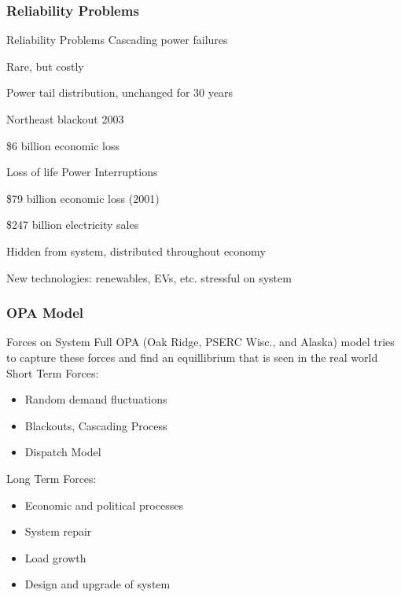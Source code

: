 \subsubsection{Reliability Problems}
\begin{frame}{Reliability Problems}
\alert{Cascading power failures}
\bi
\item Rare, but costly
\item Power tail distribution, unchanged for 30 years
\item Northeast blackout 2003
\bi
\item \$6 billion economic loss
\item Loss of life
\ei
\ei
\pause
\alert{Power Interruptions}
\bi
\item \$79 billion economic loss (2001) 
\bi
\item \$247 billion electricity sales
\ei 
\item Hidden from system, distributed throughout economy
\item New technologies: renewables, EVs, etc. stressful on system
\ei
\end{frame}


\subsubsection{OPA Model}
\begin{frame}{Forces on System}
Full OPA (Oak Ridge, PSERC Wisc., and Alaska) model tries to capture these forces and find an equillibrium that is seen in the real world \newline \\
\pause
Short Term Forces:
\begin{itemize}
\item Random demand fluctuations
\item \alert{Blackouts, Cascading Process}
\item Dispatch Model
\end{itemize}
\pause
Long Term Forces:
\begin{itemize}
\item Economic and political processes
\item System repair
\item Load growth
\item Design and upgrade of system
\end{itemize}
\end{frame}


